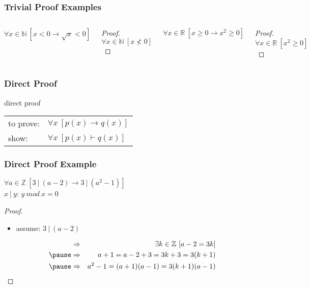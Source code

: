 \documentclass[dvipsnames]{beamer}
\begin{document}
\begin{frame}
  \frametitle{Trivial Proof Examples}

  \begin{columns}[t]
    \begin{theorem}
      $\forall x \in \mathbb{N}~[x < 0 \rightarrow \sqrt{x} < 0]$
    \end{theorem}

    \pause
    \begin{proof}
      $\forall x \in \mathbb{N}~[x \nless 0]$
    \end{proof}

    \pause
    \begin{theorem}
      $\forall x \in \mathbb{R}~[x \geq 0 \rightarrow x^2 \geq 0]$
    \end{theorem}

    \pause
    \begin{proof}
      $\forall x \in \mathbb{R}~[x^2 \geq 0]$
    \end{proof}
  \end{columns}
\end{frame}
%

\begin{frame}
  \frametitle{Direct Proof}

  \begin{block}{direct proof}
    \begin{tabular}{ll}
      to prove: & $\forall x~[p(x) \rightarrow q(x)]$\\
      show:     & $\forall x~[p(x) \vdash q(x)]$
    \end{tabular}
  \end{block}
\end{frame}

\begin{frame}
  \frametitle{Direct Proof Example}

  \begin{theorem}
    $\forall a \in \mathbb{Z}~[3~|~(a-2) \rightarrow 3~|~(a^2-1)]$\\
    $x~|~y$: $y~mod~x = 0$
  \end{theorem}

  \pause
  \begin{proof}
    \begin{itemize}
      \item assume: $3~|~(a-2)$
    \end{itemize}

    \vspace{-2em}
    \begin{eqnarray*}
      & \Rightarrow & \exists k \in \mathbb{Z}~[a-2 = 3k]\\\pause
      & \Rightarrow & a+1 = a-2 + 3 = 3k+3 = 3(k+1)\\\pause
      & \Rightarrow & a^2-1 = (a+1)(a-1) = 3(k+1)(a-1)
    \end{eqnarray*}
  \end{proof}
\end{frame}
\end{document}
